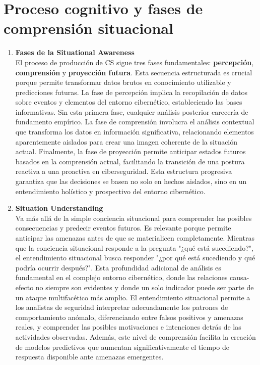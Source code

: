 \section{Proceso cognitivo y fases de comprensión situacional}
\begin{enumerate}
\item \textbf{Fases de la Situational Awareness} \\
El proceso de producción de CS sigue tres fases fundamentales: \textbf{percepción}, \textbf{comprensión} y \textbf{proyección futura}. Esta secuencia estructurada es crucial porque permite transformar datos brutos en conocimiento utilizable y predicciones futuras.
La fase de percepción implica la recopilación de datos sobre eventos y elementos del entorno cibernético, estableciendo las bases informativas. Sin esta primera fase, cualquier análisis posterior carecería de fundamento empírico. La fase de comprensión involucra el análisis contextual que transforma los datos en información significativa, relacionando elementos aparentemente aislados para crear una imagen coherente de la situación actual. Finalmente, la fase de proyección permite anticipar estados futuros basados en la comprensión actual, facilitando la transición de una postura reactiva a una proactiva en ciberseguridad. Esta estructura progresiva garantiza que las decisiones se basen no solo en hechos aislados, sino en un entendimiento holístico y prospectivo del entorno cibernético.

\item \textbf{Situation Understanding} \\
Va más allá de la simple conciencia situacional para comprender las posibles consecuencias y predecir eventos futuros. Es relevante porque permite anticipar las amenazas antes de que se materialicen completamente. Mientras que la conciencia situacional responde a la pregunta "¿qué está sucediendo?", el entendimiento situacional busca responder "¿por qué está sucediendo y qué podría ocurrir después?". Esta profundidad adicional de análisis es fundamental en el complejo entorno cibernético, donde las relaciones causa-efecto no siempre son evidentes y donde un solo indicador puede ser parte de un ataque multifacético más amplio. El entendimiento situacional permite a los analistas de seguridad interpretar adecuadamente los patrones de comportamiento anómalo, diferenciando entre falsos positivos y amenazas reales, y comprender las posibles motivaciones e intenciones detrás de las actividades observadas. Además, este nivel de comprensión facilita la creación de modelos predictivos que aumentan significativamente el tiempo de respuesta disponible ante amenazas emergentes.


\end{enumerate}
